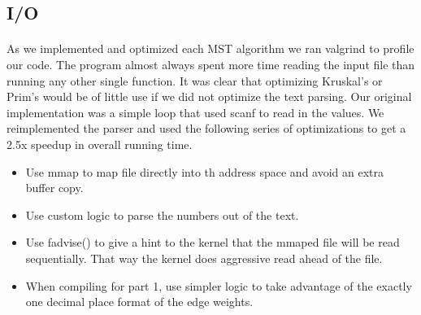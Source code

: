 \subsection{I/O}
\label{sec:deep:io}

\paragraph{}
As we implemented and optimized each MST algorithm we ran valgrind to
profile our code. The program almost always spent more time reading the
input file than running any other single function. It was clear that
optimizing Kruskal's or Prim's would be of little use if we did not
optimize the text parsing. Our original implementation was a simple loop
that used scanf to read in the values. We reimplemented the parser and used
the following series of optimizations
to get a 2.5x speedup in overall running time.
\begin{itemize}
\item
Use mmap to map file directly into th address space and avoid an extra
buffer copy.
\item
Use custom logic to parse the numbers out of the text.
\item
Use fadvise() to give a hint to the kernel that the mmaped file will be
read sequentially. That way the kernel does aggressive read ahead of the
file.
\item
When compiling for part 1, use simpler logic to take advantage of the exactly
one decimal place format of the edge weights.
\end{itemize}

